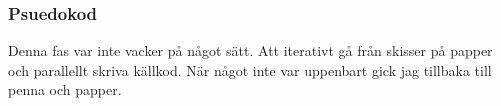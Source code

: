 \documentclass[../main.tex]{subfiles}
\begin{document}
\subsubsection{Psuedokod}
Denna fas var inte vacker på något sätt. Att iterativt gå från skisser på papper och parallellt skriva källkod. När något inte var uppenbart gick jag tillbaka till penna och papper.






\newpage
\end{document}
